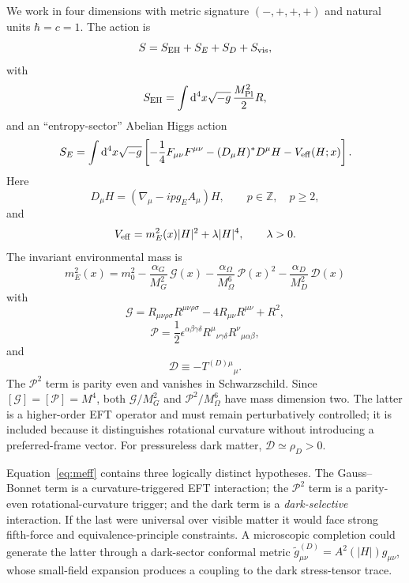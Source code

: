 \documentclass[11pt]{article}
\newcommand{\dd}{\mathrm{d}}
\newcommand{\mpl}{M_{\rm Pl}}
\newcommand{\Geff}{\mathcal G}
\newcommand{\Ddark}{\mathcal D}
\newcommand{\Pontryagin}{\mathcal P}
\begin{document}
We work in four dimensions with metric signature $(-,+,+,+)$ and natural units $\hbar=c=1$.  The action is
\begin{equation}
S=S_{\rm EH}+S_E+S_D+S_{\rm vis},
\end{equation}
with
\begin{equation}
S_{\rm EH}=\int \dd^4x\sqrt{-g}\,\frac{\mpl^2}{2}R,
\end{equation}
and an ``entropy-sector'' Abelian Higgs action
\begin{equation}
S_E=\int \dd^4x\sqrt{-g}\left[
-\frac14 F_{\mu\nu}F^{\mu\nu}
-(D_\mu H)^\ast D^\mu H
-V_{\rm eff}(H;x)
\right].
\label{eq:SE}
\end{equation}
Here
\begin{equation}
D_\mu H=(\nabla_\mu-i p g_E A_\mu)H,
\qquad p\in\mathbb Z,\quad p\ge2,
\end{equation}
and
\begin{equation}
V_{\rm eff}=m_E^2(x)|H|^2+\lambda |H|^4,
\qquad \lambda>0.
\label{eq:Veff}
\end{equation}
The invariant environmental mass is
\begin{equation}
\boxed{
 m_E^2(x)=m_0^2
 -\frac{\alpha_G}{M_G^2}\,\Geff(x)
 -\frac{\alpha_\Omega}{M_\Omega^6}\,\Pontryagin(x)^2
 -\frac{\alpha_D}{M_D^2}\,\Ddark(x)
}
\label{eq:meff}
\end{equation}
with
\begin{equation}
\Geff=R_{\mu\nu\rho\sigma}R^{\mu\nu\rho\sigma}
-4R_{\mu\nu}R^{\mu\nu}+R^2,
\end{equation}
\begin{equation}
\Pontryagin=\frac12\epsilon^{\alpha\beta\gamma\delta}
R^\mu{}_{\nu\gamma\delta}R^\nu{}_{\mu\alpha\beta},
\end{equation}
and
\begin{equation}
\Ddark\equiv- T^{(D)\mu}{}_{\mu}.
\end{equation}
The $\Pontryagin^2$ term is parity even and vanishes in Schwarzschild.  Since $[\Geff]=[\Pontryagin]=M^4$, both $\Geff/M_G^2$ and $\Pontryagin^2/M_\Omega^6$ have mass dimension two.  The latter is a higher-order EFT operator and must remain perturbatively controlled; it is included because it distinguishes rotational curvature without introducing a preferred-frame vector.
For pressureless dark matter, $\Ddark\simeq\rho_D>0$.

Equation~\eqref{eq:meff} contains three logically distinct hypotheses.  The Gauss--Bonnet term is a curvature-triggered EFT interaction; the $\Pontryagin^2$ term is a parity-even rotational-curvature trigger; and the dark term is a \emph{dark-selective} interaction.  If the last were universal over visible matter it would face strong fifth-force and equivalence-principle constraints.  A microscopic completion could generate the latter through a dark-sector conformal metric $\tilde g^{(D)}_{\mu\nu}=A^2(|H|)g_{\mu\nu}$, whose small-field expansion produces a coupling to the dark stress-tensor trace.
\end{document}
